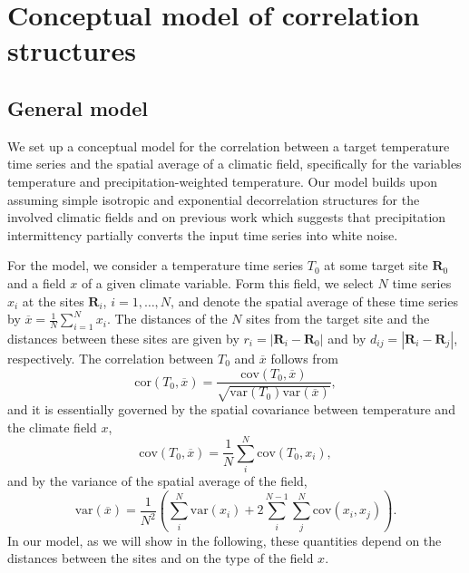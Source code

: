 \documentclass[cp, manuscript]{copernicus}
\begin{document}
\appendix

\section{Conceptual model of correlation structures}
\label{app:concept.model}

\subsection{General model}
\label{app:concept.model.general}

We set up a conceptual model for the correlation between a target temperature
time series and the spatial average of a climatic field, specifically for the
variables temperature and precipitation-weighted temperature. Our model builds
upon assuming simple isotropic and exponential decorrelation structures for the
involved climatic fields and on previous work which suggests that precipitation
intermittency partially converts the input time series into white noise.

For the model, we consider a temperature time series $T_0$ at some target site
$\mathbf{R}_0$ and a field $x$ of a given climate variable. Form this field, we
select $N$ time series $x_i$ at the sites $\mathbf{R}_i$, $i=1,\dotsc,N$, and
denote the spatial average of these time series by
$\overline{x}=\frac{1}{N}\sum_{i=1}^{N}{x_i}$. The distances of the $N$ sites
from the target site and the distances between these sites are given by
$r_i=|\mathbf{R}_i-\mathbf{R}_0|$ and by $d_{ij}=|{\mathbf{R}_i-\mathbf{R}_j}|$,
respectively. The correlation between $T_0$ and $\overline{x}$ follows from
%
\begin{equation}
\label{eq:corr.general}
\mathrm{cor}(T_0,\overline{x})=\frac
{\mathrm{cov}(T_0,\overline{x})}
{\sqrt{\mathrm{var}(T_0)\mathrm{var}(\overline{x})}},
\end{equation}
and it is essentially governed by the spatial covariance between temperature and
the climate field $x$,
%
\begin{equation}
\label{eq:cov.general}
\mathrm{cov}(T_0,\overline{x})=
\frac{1}{N}\sum_{i}^{N}{\mathrm{cov}(T_0,x_i)},
\end{equation}
%
and by the variance of the spatial average of the field,
\begin{equation}
\label{eq:var.general}
\mathrm{var}(\overline{x})=
\frac{1}{N^2}\left(
\sum_{i}^{N}{\mathrm{var}(x_i)} +
2\sum_{i}^{N-1}\sum_{j}^{N}{\mathrm{cov}(x_i,x_j)}
\right).
\end{equation}
%
In our model, as we will show in the following, these quantities depend on the
distances between the sites and on the type of the field $x$.
\end{document}
